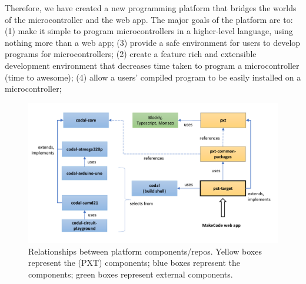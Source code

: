 Therefore, we have created a new programming platform that bridges the worlds of the microcontroller
and the web app. The major goals of the platform are to:
(1) make it simple to program microcontrollers in a higher-level language, using nothing more than a web app;
(3) provide a safe environment for users to develop programs for microcontrollers;
(2) create a feature rich and extensible development environment that decreases time taken to program a microcontroller (time to awesome);
(4) allow a users' compiled program to be easily installed on a microcontroller;

\begin{figure}[t]
  \includegraphics[width=5.5in]{reposFig.pdf}
  \caption{\label{fig:repos}Relationships between platform components/repos. Yellow boxes represent the \MC (PXT) components; blue
  boxes represent the \CO components; green boxes represent external components.}
\end{figure}


